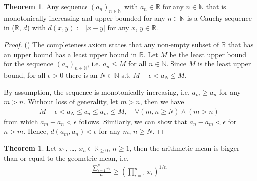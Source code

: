 \documentclass[12pt, a4paper]{article}
\numberwithin{equation}{section}
\theoremstyle{definition}
\theoremstyle{definition}
\newtheorem{theorem}[thm]{Theorem}
\newcommand{\abs}[1]{\left\vert #1 \right\vert}
\begin{document}
	\begin{theorem}\label{thrm:mono_inc_seq_Cauchy}
		Any sequence $(a_n)_{n\in\mathbb N}$ with $a_n\in \mathbb R$ for any $n\in \mathbb N$ that is monotonically increasing and upper bounded for any $n\in\mathbb N$ is a Cauchy sequence in ($\mathbb R$, $d$) with $d(x, y):= \abs{x - y}$ for any \newline $x$, $y\in \mathbb R$.		
	\end{theorem}

	\begin{proof}(\cite{2169936})
		The completeness axiom states that any non-empty subset of $\mathbb R$ that has an upper bound has a least upper bound in $\mathbb R$. Let $M$ be the least upper bound for the sequence $(a_n)_{n\in\mathbb N}$, i.e. $a_n \leq M$ for all $n\in\mathbb N$. Since $M$ is the least upper bound, for all $\epsilon > 0$ there is an $N\in\mathbb N$ s.t. $M - \epsilon < a_N \leq M$.
		
		By assumption, the sequence is monotonically increasing, i.e. $a_m \geq a_n$ for any $m > n$. Without loss of generality, let $m > n$, then we have
		\begin{align}\label{eq:mono_inc_seq_Cauchy}
			M - \epsilon < a_N \leq a_n \leq a_m \leq M, \quad \forall (m, n\geq N) \wedge (m > n)
		\end{align}
		from which $a_m - a_n < \epsilon$ follows. Similarly, we can show that $a_n - a_m < \epsilon$ for $n > m$. Hence, $d(a_m, a_n) < \epsilon$ for any $m$, $n\geq N$.
	\end{proof}
	
	\begin{theorem}\label{thrm:AM-GM}
		Let $x_1$, \dots, $x_n\in\mathbb R_{\geq 0}$, $n\geq 1$, then the arithmetic mean is bigger than or equal to the geometric mean, i.e.
		\begin{align}\label{eq:AM-GM}
			\frac{\sum_{i=1}^{n} x_i}{n} \geq \left(\prod_{i=1}^{n}x_i\right)^{1/n}
		\end{align}
	\end{theorem}
	
\end{document}
